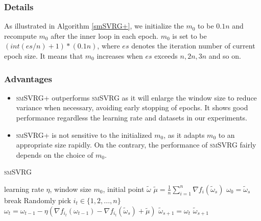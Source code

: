 \documentclass[conference]{IEEEtran}
\begin{document}
 \subsubsection{Details}
 As illustrated in Algorithm \ref{smSVRG+}, we initialize the $m_0$ to be $0.1n$ and recompute $m_0$ after the inner loop in each epoch. $m_0$ is set to be $(int(es/n)+1) * (0.1n)$, where $es$ denotes the iteration number of current epoch size. It means that $m_0$ increases when $es$ exceeds $n,2n,3n$ and so on.
 \subsubsection{Advantages}
 \begin{itemize}
 \item \textsc{smSVRG+} outperforms \textsc{smSVRG} as it will enlarge the window size to reduce variance when necessary, avoiding early stopping of epochs. It shows good performance regardless the learning rate and datasets in  our experiments. 
 \item \textsc{smSVRG+} is not sensitive to the initialized $m_0$, as it adapts $m_0$ to an appropriate size rapidly. On the contrary, the performance of \textsc{smSVRG} fairly depends on the choice of $m_0$.
 \end{itemize}
 
 
 \begin{algorithm}[t]
 	\caption{\textsc{smSVRG}}
	\label{smSVRG}
	\begin{algorithmic}[1]
	\Require learning rate $\eta$, window size $m_0$, initial point $\tilde{\omega}$
		\State $\tilde{\mu} = \frac{1}{n}\sum\limits_{i=1}^{n}\nabla f_{i}(\tilde{\omega}_{s})$
		\State $\omega_0 = \tilde{\omega}_s$
			\State break
			\EndIf
			\State Randomly pick $i_t\in\{1, 2, ..., n\}$
			\State $\omega_t = \omega_{t-1} - \eta(\nabla f_{i_t}(\omega_{t-1}) - \nabla f_{i_t}(\tilde{\omega}_s)+\tilde{\mu})$
		\EndFor		
		\State $\tilde{\omega}_{s+1} = \omega_{t}$
	\EndFor
	\State \Return $\tilde{\omega}_{s+1}$
	\end{algorithmic}
\end{algorithm}
\end{document}

